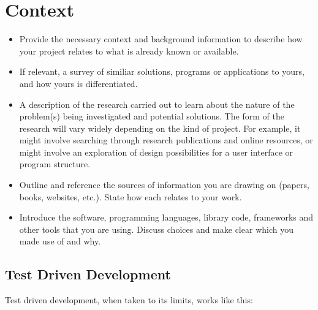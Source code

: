 \section{Context}
\label{sec:context}

\begin{framed}
	\begin{itemize}
		\item Provide the necessary context and background information to describe how your project relates to what is already known or available.
		\item If relevant, a survey of similiar solutions, programs or applications to yours, and how yours is differentiated.
		\item A description of the research carried out to learn about the nature of the problem(s) being investigated and potential solutions. The form of the research will vary widely depending on the kind of project. For example, it might involve searching through research publications and online resources, or might involve an exploration of design possibilities for a user interface or program structure.
		\item Outline and reference the sources of information you are drawing on (papers, books, websites, etc.). State how each relates to your work.
		\item Introduce the software, programming languages, library code, frameworks and other tools that you are using. Discuss choices and make clear which you made use of and why.
	\end{itemize}
\end{framed}

\subsection{Test Driven Development}

Test driven development, when taken to its limits, works like this:

